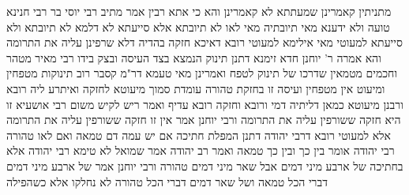\documentclass[12pt, openany]{book}
\begin{document}
{מתניתין קאמרינן שמעתתא לא קאמרינן 
והא כי אתא רבין אמר  מתיב רבי יוסי בר רבי חנינא טועה ולא ידענא מאי תיובתיה
מאי לאו  לא תיובתא אלא סייעתא 
לא דלמא  לא תיובתא ולא סייעתא 
למעוטי מאי 
אילימא למעוטי רובא דאיכא חזקה בהדיה דלא שרפינן עליה את התרומה והא אמרה ר' יוחנן חדא זימנא 
דתנן  תינוק הנמצא בצד העיסה ובצק בידו רבי מאיר מטהר וחכמים מטמאין שדרכו של תינוק לטפח 
ואמרינן  מאי טעמא דר"מ קסבר  רוב תינוקות מטפחין ומיעוט אין מטפחין ועיסה זו בחזקת טהורה עומדת סמוך מיעוטא לחזקה ואיתרע ליה רובא 
ורבנן מיעוטא כמאן דליתיה דמי ורובא וחזקה רובא עדיף 
ואמר ריש לקיש משום רבי אושעיא  זו היא חזקה ששורפין עליה את התרומה ורבי יוחנן אמר  אין זו חזקה ששורפין עליה את התרומה 
אלא למעוטי רובא דרבי יהודה  דתנן המפלת חתיכה אם יש עמה דם טמאה ואם לאו טהורה  רבי יהודה אומר  בין כך ובין כך טמאה 
ואמר רב יהודה אמר שמואל  לא טימא רבי יהודה אלא בחתיכה של ארבע מיני דמים אבל שאר מיני דמים טהורה  ורבי יוחנן אמר  של ארבע מיני דמים דברי הכל טמאה ושל שאר דמים דברי הכל טהורה  לא נחלקו אלא כשהפילה}
\end{document}
